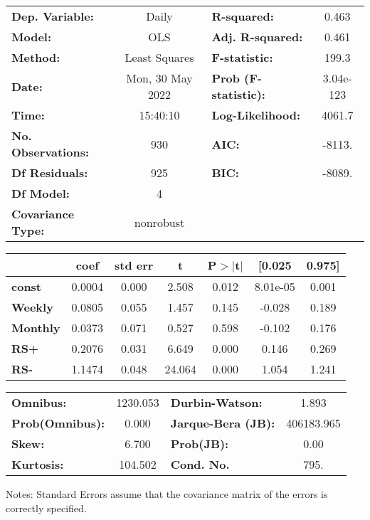 \begin{center}
\begin{tabular}{lclc}
\toprule
\textbf{Dep. Variable:}    &      Daily       & \textbf{  R-squared:         } &     0.463   \\
\textbf{Model:}            &       OLS        & \textbf{  Adj. R-squared:    } &     0.461   \\
\textbf{Method:}           &  Least Squares   & \textbf{  F-statistic:       } &     199.3   \\
\textbf{Date:}             & Mon, 30 May 2022 & \textbf{  Prob (F-statistic):} & 3.04e-123   \\
\textbf{Time:}             &     15:40:10     & \textbf{  Log-Likelihood:    } &    4061.7   \\
\textbf{No. Observations:} &         930      & \textbf{  AIC:               } &    -8113.   \\
\textbf{Df Residuals:}     &         925      & \textbf{  BIC:               } &    -8089.   \\
\textbf{Df Model:}         &           4      & \textbf{                     } &             \\
\textbf{Covariance Type:}  &    nonrobust     & \textbf{                     } &             \\
\bottomrule
\end{tabular}
\begin{tabular}{lcccccc}
                 & \textbf{coef} & \textbf{std err} & \textbf{t} & \textbf{P$> |$t$|$} & \textbf{[0.025} & \textbf{0.975]}  \\
\midrule
\textbf{const}   &       0.0004  &        0.000     &     2.508  &         0.012        &     8.01e-05    &        0.001     \\
\textbf{Weekly}  &       0.0805  &        0.055     &     1.457  &         0.145        &       -0.028    &        0.189     \\
\textbf{Monthly} &       0.0373  &        0.071     &     0.527  &         0.598        &       -0.102    &        0.176     \\
\textbf{RS+}     &       0.2076  &        0.031     &     6.649  &         0.000        &        0.146    &        0.269     \\
\textbf{RS-}     &       1.1474  &        0.048     &    24.064  &         0.000        &        1.054    &        1.241     \\
\bottomrule
\end{tabular}
\begin{tabular}{lclc}
\textbf{Omnibus:}       & 1230.053 & \textbf{  Durbin-Watson:     } &     1.893   \\
\textbf{Prob(Omnibus):} &   0.000  & \textbf{  Jarque-Bera (JB):  } & 406183.965  \\
\textbf{Skew:}          &   6.700  & \textbf{  Prob(JB):          } &      0.00   \\
\textbf{Kurtosis:}      & 104.502  & \textbf{  Cond. No.          } &      795.   \\
\bottomrule
\end{tabular}
\end{center}

Notes: \newline
 [1] Standard Errors assume that the covariance matrix of the errors is correctly specified.